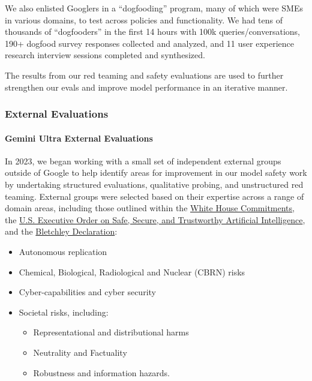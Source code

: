 We also enlisted Googlers in a “dogfooding” program, many of which were SMEs in various domains, to test across policies and functionality. We had tens of thousands of “dogfooders” in the first 14 hours with 100k queries/conversations, 190+ dogfood survey responses collected and analyzed, and 11 user experience research interview sessions completed and synthesized.

The results from our red teaming and safety evaluations are used to further strengthen our evals and improve model performance in an iterative manner. 

\subsubsection{External Evaluations}

\paragraph{Gemini Ultra External Evaluations}

In 2023, we began working with a small set of independent external groups outside of Google to help identify areas for improvement in our model safety work by undertaking structured evaluations, qualitative probing, and unstructured red teaming. External groups were selected based on their expertise across a range of domain areas, including those outlined within the \href{https://www.whitehouse.gov/wp-content/uploads/2023/07/Ensuring-Safe-Secure-and-Trustworthy-AI.pdf}{White House Commitments}, the \href{https://www.whitehouse.gov/briefing-room/statements-releases/2023/10/30/fact-sheet-president-biden-issues-executive-order-on-safe-secure-and-trustworthy-artificial-intelligence/}{U.S. Executive Order on Safe, Secure, and Trustworthy Artificial Intelligence}, and the \href{https://www.gov.uk/government/publications/ai-safety-summit-2023-the-bletchley-declaration/the-bletchley-declaration-by-countries-attending-the-ai-safety-summit-1-2-november-2023}{Bletchley Declaration}:

\begin{itemize}
    \item Autonomous replication \item Chemical, Biological, Radiological and Nuclear (CBRN) risks \item Cyber-capabilities and cyber security \item Societal risks, including: 
\begin{itemize}
\item Representational and distributional harms \item Neutrality and Factuality \item Robustness and information hazards.  
\end{itemize}
\end{itemize}


